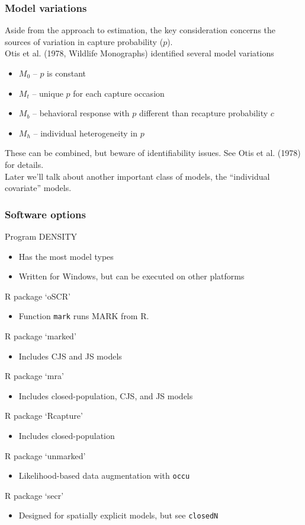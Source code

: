 \documentclass[color=usenames,dvipsnames]{beamer}\usepackage[]{graphicx}\usepackage[]{color}
\newcommand{\inr}[1]{\colorbox{inlinecolor}{\texttt{#1}}}
\begin{document}
\begin{frame}
  \frametitle{Model variations}
  Aside from the approach to estimation, the key consideration
  concerns the sources of variation in capture probability ($p$). \\
  \pause
  \vfill
  Otis et al. (1978, Wildlife Monographs) identified several model variations
  \begin{itemize}
    \small
    \item $M_0$ -- $p$ is constant
    \item $M_t$ -- unique $p$ for each capture occasion
    \item \hangindent=0.8cm $M_b$ -- behavioral response with $p$ different than
      recapture probability $c$
    \item $M_h$ -- individual heterogeneity in $p$
  \end{itemize}
  \pause \vfill
  These can be combined, but beware of identifiability issues. See
  Otis et al. (1978) for details.  \\
  \pause \vfill
  Later we'll talk about another important class of models, the
  ``individual covariate'' models.  
\end{frame}




\begin{frame}
  \frametitle{Software options}
  \small
  Program DENSITY
  \begin{itemize}
  \footnotesize
    \item Has the most model types
    \item Written for Windows, but can be executed on other platforms  
  \end{itemize}
  R package `oSCR'
  \begin{itemize}
  \footnotesize
    \item Function \inr{mark} runs MARK from R.
  \end{itemize}
  R package `marked'
  \begin{itemize}
  \footnotesize
    \item Includes CJS and JS models
  \end{itemize}
  R package `mra'
  \begin{itemize}
  \footnotesize
    \item Includes closed-population, CJS, and JS models
  \end{itemize}
  R package `Rcapture'
  \begin{itemize}
  \footnotesize
    \item Includes closed-population
  \end{itemize}
  R package `unmarked'
  \begin{itemize}
  \footnotesize
    \item Likelihood-based data augmentation with \inr{occu}
  \end{itemize}
  R package `secr'
  \begin{itemize}
  \footnotesize
    \item Designed for spatially explicit models, but see \inr{closedN}
  \end{itemize}
\end{frame}
\end{document}

